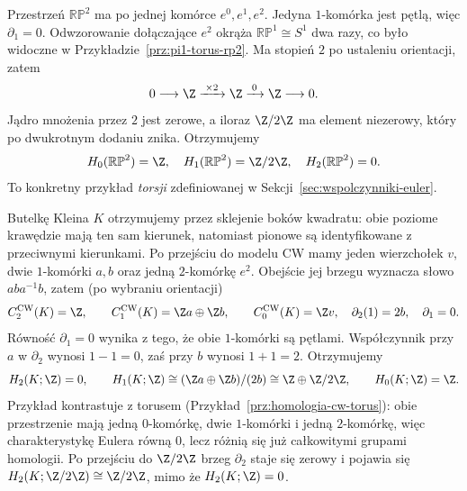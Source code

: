 \begin{przyklad}
\label{prz:homologia-rp2}
Przestrzeń $\mathbb{RP}^2$
ma po jednej komórce
$e^0,e^1,e^2$.
Jedyna $1$-komórka jest pętlą,
więc $\partial_1=0$.
Odwzorowanie dołączające $e^2$
okrąża $\mathbb{RP}^1\cong S^1$
dwa razy, co było widoczne
w Przykładzie~\ref{prz:pi1-torus-rp2}.
Ma stopień $2$ po ustaleniu
orientacji, zatem
\[
 0\longrightarrow\Z
 \xrightarrow{\;\times2\;}\Z
 \xrightarrow{\;0\;}\Z
 \longrightarrow0.
\]
Jądro mnożenia przez $2$
jest zerowe, a iloraz
$\Z/2\Z$ ma element
niezerowy, który po
dwukrotnym dodaniu znika.
Otrzymujemy
\[
 H_0(\mathbb{RP}^2)=\Z,\quad
 H_1(\mathbb{RP}^2)=\Z/2\Z,\quad
 H_2(\mathbb{RP}^2)=0.
\]
To konkretny przykład \emph{torsji}
zdefiniowanej w
Sekcji~\ref{sec:wspolczynniki-euler}.
\end{przyklad}

\begin{przyklad}
\label{prz:homologia-butelka-kleina}
Butelkę Kleina $K$ otrzymujemy przez sklejenie boków
kwadratu: obie poziome krawędzie mają ten sam kierunek,
natomiast pionowe są identyfikowane z przeciwnymi
kierunkami. Po przejściu do modelu CW mamy
jeden wierzchołek $v$, dwie $1$-komórki $a,b$
oraz jedną $2$-komórkę $e^2$.
Obejście jej brzegu wyznacza słowo
$aba^{-1}b$, zatem (po wybraniu orientacji)
\[
 C_2^{\mathrm{CW}}(K)=\Z,\qquad
 C_1^{\mathrm{CW}}(K)=\Z a\oplus\Z b,\qquad
 C_0^{\mathrm{CW}}(K)=\Z v,
 \quad \partial_2(1)=2b,\quad\partial_1=0.
\]
Równość $\partial_1=0$ wynika z tego, że obie
$1$-komórki są pętlami. Współczynnik przy $a$
w $\partial_2$ wynosi $1-1=0$, zaś przy $b$
wynosi $1+1=2$. Otrzymujemy
\[
 H_2(K;\Z)=0,\qquad
 H_1(K;\Z)\cong
 (\Z a\oplus\Z b)/(2b)
 \cong\Z\oplus\Z/2\Z,\qquad
 H_0(K;\Z)=\Z.
\]
Przykład kontrastuje z torusem
(Przykład~\ref{prz:homologia-cw-torus}):
obie przestrzenie mają jedną $0$-komórkę,
dwie $1$-komórki i jedną $2$-komórkę,
więc charakterystykę Eulera równą $0$,
lecz różnią się już całkowitymi grupami homologii.
Po przejściu do $\Z/2\Z$ brzeg $\partial_2$
staje się zerowy i pojawia się
$H_2(K;\Z/2\Z)\cong\Z/2\Z$,
mimo że $H_2(K;\Z)=0$.
\end{przyklad}

